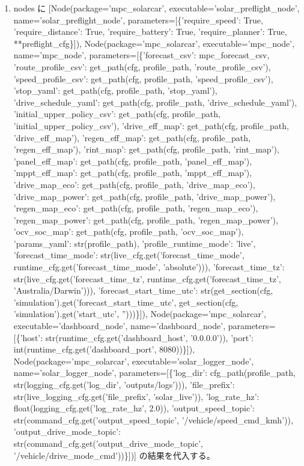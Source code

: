 \documentclass[a4paper,11pt]{article}
\begin{document}
\begin{enumerate}[leftmargin=1.8em]
\item nodes に [Node(package='mpc\_solarcar', executable='solar\_preflight\_node', name='solar\_preflight\_node', parameters=[\{'require\_speed': True, 'require\_distance': True, 'require\_battery': True, 'require\_planner': True, **preflight\_cfg\}]), Node(package='mpc\_solarcar', executable='mpc\_node', name='mpc\_node', parameters=[\{'forecast\_csv': mpc\_forecast\_csv, 'route\_profile\_csv': get\_path(cfg, profile\_path, 'route\_profile\_csv'), 'speed\_profile\_csv': get\_path(cfg, profile\_path, 'speed\_profile\_csv'), 'stop\_yaml': get\_path(cfg, profile\_path, 'stop\_yaml'), 'drive\_schedule\_yaml': get\_path(cfg, profile\_path, 'drive\_schedule\_yaml'), 'initial\_upper\_policy\_csv': get\_path(cfg, profile\_path, 'initial\_upper\_policy\_csv'), 'drive\_eff\_map': get\_path(cfg, profile\_path, 'drive\_eff\_map'), 'regen\_eff\_map': get\_path(cfg, profile\_path, 'regen\_eff\_map'), 'rint\_map': get\_path(cfg, profile\_path, 'rint\_map'), 'panel\_eff\_map': get\_path(cfg, profile\_path, 'panel\_eff\_map'), 'mppt\_eff\_map': get\_path(cfg, profile\_path, 'mppt\_eff\_map'), 'drive\_map\_eco': get\_path(cfg, profile\_path, 'drive\_map\_eco'), 'drive\_map\_power': get\_path(cfg, profile\_path, 'drive\_map\_power'), 'regen\_map\_eco': get\_path(cfg, profile\_path, 'regen\_map\_eco'), 'regen\_map\_power': get\_path(cfg, profile\_path, 'regen\_map\_power'), 'ocv\_soc\_map': get\_path(cfg, profile\_path, 'ocv\_soc\_map'), 'params\_yaml': str(profile\_path), 'profile\_runtime\_mode': 'live', 'forecast\_time\_mode': str(live\_cfg.get('forecast\_time\_mode', runtime\_cfg.get('forecast\_time\_mode', 'absolute'))), 'forecast\_time\_tz': str(live\_cfg.get('forecast\_time\_tz', runtime\_cfg.get('forecast\_time\_tz', 'Australia/Darwin'))), 'forecast\_start\_time\_utc': str(get\_section(cfg, 'simulation').get('forecast\_start\_time\_utc', get\_section(cfg, 'simulation').get('start\_utc', '')))\}]), Node(package='mpc\_solarcar', executable='dashboard\_node', name='dashboard\_node', parameters=[\{'host': str(runtime\_cfg.get('dashboard\_host', '0.0.0.0')), 'port': int(runtime\_cfg.get('dashboard\_port', 8080))\}]), Node(package='mpc\_solarcar', executable='solar\_logger\_node', name='solar\_logger\_node', parameters=[\{'log\_dir': cfg\_path(profile\_path, str(logging\_cfg.get('log\_dir', 'outputs/logs'))), 'file\_prefix': str(live\_logging\_cfg.get('file\_prefix', 'solar\_live')), 'log\_rate\_hz': float(logging\_cfg.get('log\_rate\_hz', 2.0)), 'output\_speed\_topic': str(command\_cfg.get('output\_speed\_topic', '/vehicle/speed\_cmd\_kmh')), 'output\_drive\_mode\_topic': str(command\_cfg.get('output\_drive\_mode\_topic', '/vehicle/drive\_mode\_cmd'))\}])] の結果を代入する。

\end{enumerate}
\end{document}
